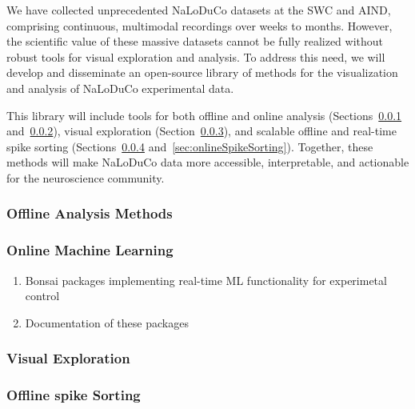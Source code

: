 We have collected unprecedented NaLoDuCo datasets at the SWC and AIND,
comprising continuous, multimodal recordings over weeks to months. However, the
scientific value of these massive datasets cannot be fully realized without
robust tools for visual exploration and analysis. To address this need, we will
develop and disseminate an open-source library of methods for the visualization
and analysis of NaLoDuCo experimental data.

This library will include tools for both offline and online analysis
(Sections~\ref{sec:offlineAnalysisMethods}
and~\ref{sec:onlineAnalysisMethods}), visual exploration
(Section~\ref{sec:visualExploration}), and scalable offline and real-time spike
sorting (Sections~\ref{sec:offlineSpikeSorting}
and~\ref{sec:onlineSpikeSorting}). Together, these methods will make NaLoDuCo
data more accessible, interpretable, and actionable for the neuroscience
community.

\subsubsection{Offline Analysis Methods}
\label{sec:offlineAnalysisMethods}



\subsubsection{Online Machine Learning}
\label{sec:onlineAnalysisMethods}


\begin{enumerate}

    \item Bonsai packages implementing real-time ML functionality for experimetal control

    \item Documentation of these packages

\end{enumerate}

\subsubsection{Visual Exploration}
\label{sec:visualExploration}



\subsubsection{Offline spike Sorting}
\label{sec:offlineSpikeSorting}

